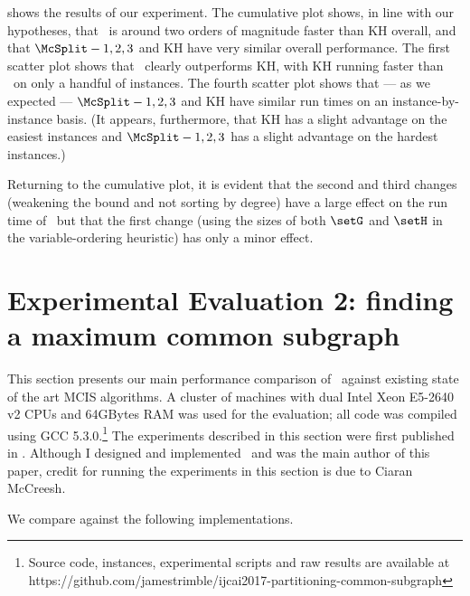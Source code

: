  shows the results of our experiment.  The cumulative plot shows,
in line with our hypotheses,
that \McSplit\ is around two orders of magnitude faster than KH overall, and that
$\McSplit - 1,2,3$ and KH have very similar overall performance.  The first scatter
plot shows that \McSplit\ clearly outperforms KH, with KH running faster than \McSplit\
on only a handful of instances.  The fourth scatter plot shows that --- as we expected ---
$\McSplit - 1,2,3$ and KH have similar run times on an instance-by-instance basis.
(It appears, furthermore, that
KH has a slight advantage on the easiest instances and
$\McSplit - 1,2,3$ has a slight advantage on the hardest instances.)

Returning to the cumulative plot, it is evident that the second and third changes (weakening
the bound and not sorting by degree) have a large effect on the run time of \McSplit\,
but that the first change (using the sizes of both $\setG$ and $\setH$ in the variable-ordering
heuristic) has only a minor effect.

\FloatBarrier

\section{Experimental Evaluation 2: finding a maximum common subgraph}
\label{sec:mcsplit-experiments}

This section presents our main performance comparison of \McSplit\ against
existing state of the art MCIS algorithms.
A cluster of machines with dual Intel Xeon E5-2640 v2 CPUs and
64GBytes RAM was used for the evaluation; all code was compiled
using GCC 5.3.0.\footnote{Source code, instances, experimental scripts and raw
results are available at
https://github.com/jamestrimble/ijcai2017-partitioning-common-subgraph}
The experiments described in this section were first published in
\citet{DBLP:conf/ijcai/McCreeshPT17}.  Although I designed and implemented
\McSplit\ and was the main author of this paper, credit for running
the experiments in this section is due to Ciaran McCreesh.

We compare against the following implementations.

